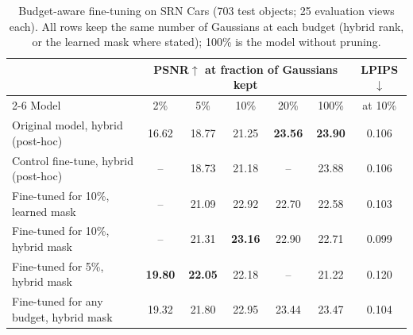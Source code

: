 \begin{table}[t]
\centering
\small
\begin{tabular}{lcccccc}
\toprule
& \multicolumn{5}{c}{PSNR$\uparrow$ at fraction of Gaussians kept} & LPIPS$\downarrow$ \\
\cmidrule(lr){2-6}
Model & 2\% & 5\% & 10\% & 20\% & 100\% & at 10\% \\
\midrule
Original model, hybrid (post-hoc) & 16.62 & 18.77 & 21.25 & \textbf{23.56} & \textbf{23.90} & 0.106 \\
Control fine-tune, hybrid (post-hoc) & -- & 18.73 & 21.18 & -- & 23.88 & 0.106 \\
Fine-tuned for 10\%, learned mask & -- & 21.09 & 22.92 & 22.70 & 22.58 & 0.103 \\
Fine-tuned for 10\%, hybrid mask & -- & 21.31 & \textbf{23.16} & 22.90 & 22.71 & 0.099 \\
Fine-tuned for 5\%, hybrid mask & \textbf{19.80} & \textbf{22.05} & 22.18 & -- & 21.22 & 0.120 \\
Fine-tuned for any budget, hybrid mask & 19.32 & 21.80 & 22.95 & 23.44 & 23.47 & 0.104 \\
\bottomrule
\end{tabular}
\caption{Budget-aware fine-tuning on SRN Cars (703 test objects; 25 evaluation views each). All rows keep the same number of Gaussians at each budget (hybrid rank, or the learned mask where stated); 100\% is the model without pruning.}
\label{tab:level3}
\end{table}
